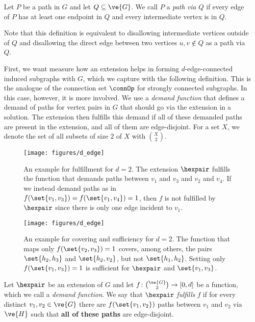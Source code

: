 \begin{definition}
  Let $P$ be a path in $G$ and let $Q \subseteq \ve{G}$. We call $P$ a \emph{path via $Q$} if every edge of $P$ has at least one endpoint in $Q$ and every intermediate vertex is in $Q$.
\end{definition}

Note that this definition is equivalent to disallowing intermediate vertices outside of $Q$ and disallowing the direct edge between two vertices $u, v \notin Q$ as a path via $Q$.

First, we want measure how an extension helps in forming $d$-edge-connected induced subgraphs with $G$, which we capture with the following definition. This is the analogue of the connection set $\connOp$ for strongly connected subgraphs. In this case, however, it is more involved. We use a \emph{demand function} that defines a demand of paths for vertex pairs in $G$ that should go via the extension in a solution. The extension then fulfills this demand if all of these demanded paths are present in the extension, and all of them are edge-disjoint. For a set $X$, we denote the set of all subsets of size 2 of $X$ with $\binom{X}{2}$.

\begin{figure}[t]
    \begin{minipage}[c]{0.45\linewidth}
    \centering
    \texttt{[image: figures/d\_edge]}
    \caption{An example for fulfillment for $d = 2$. The extension $\hexpair$ fulfills the function that demands paths between $v_1$ and $v_3$ and $v_2$ and $v_4$. If we instead demand paths as in $f(\set{v_1, v_3}) = f(\set{v_1,v_4}) = 1$, then $f$ is not fulfilled by $\hexpair$ since there is only one edge incident to $v_1$.}
    \label{fig:fulfill}
    \end{minipage}
    \hfill
    \begin{minipage}[c]{0.45\linewidth}
    \centering
    \texttt{[image: figures/d\_edge]}
    \caption{An example for covering and sufficiency for $d = 2$. The function that maps only $f(\set{v_2,v_3}) = 1$ covers, among others, the pairs $\set{h_2,h_3}$ and $\set{h_2, v_2}$, but not $\set{h_1,h_2}$. Setting only $f(\set{v_1, v_3}) = 1$ is sufficient for $\hexpair$ and $\set{v_1, v_3}$.}
    \label{fig:sufficient}
    \end{minipage}
\end{figure}

\begin{definition}[Fulfillment]
  Let $\hexpair$ be an extension of $G$ and let $f \colon \binom{\ve{G}}{2} \to [0,d]$ be a function, which we call a \emph{demand function}. We say that $\hexpair$ \emph{fulfills} $f$ if for every distinct $v_1, v_2 \in \ve{G}$ there are $f(\set{v_1, v_2})$ paths between $v_1$ and $v_2$ via $\ve{H}$ such that \textbf{all of these paths} are edge-disjoint.
\end{definition} 

